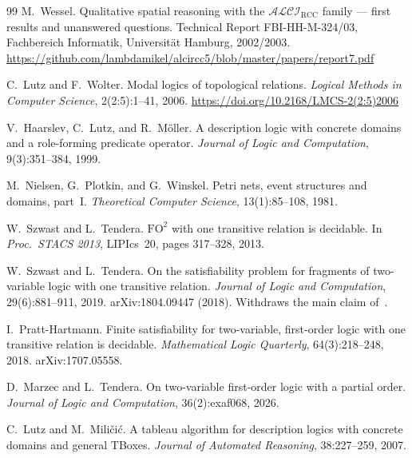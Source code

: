 \documentclass[11pt]{article}
\newcommand{\ALCIRCC}[1]{\mathcal{ALCI}_{\mathrm{RCC#1}}}
\theoremstyle{plain}
\theoremstyle{definition}
\begin{document}
\begin{thebibliography}{99}
M.\ Wessel.
\newblock Qualitative spatial reasoning with the $\ALCIRCC{}$ family ---
  first results and unanswered questions.
\newblock Technical Report FBI-HH-M-324/03, Fachbereich Informatik,
  Universit\"at Hamburg, 2002/2003.
\newblock \url{https://github.com/lambdamikel/alcircc5/blob/master/papers/report7.pdf}

C.\ Lutz and F.\ Wolter.
\newblock Modal logics of topological relations.
\newblock \emph{Logical Methods in Computer Science}, 2(2:5):1--41, 2006.
\newblock \url{https://doi.org/10.2168/LMCS-2(2:5)2006}

V.\ Haarslev, C.\ Lutz, and R.\ M\"oller.
\newblock A description logic with concrete domains and a role-forming
  predicate operator.
\newblock \emph{Journal of Logic and Computation}, 9(3):351--384, 1999.

M.\ Nielsen, G.\ Plotkin, and G.\ Winskel.
\newblock Petri nets, event structures and domains, part~I.
\newblock \emph{Theoretical Computer Science}, 13(1):85--108, 1981.

W.\ Szwast and L.\ Tendera.
\newblock $\mathrm{FO}^2$ with one transitive relation is decidable.
\newblock In \emph{Proc.\ STACS 2013}, LIPIcs~20, pages 317--328, 2013.

W.\ Szwast and L.\ Tendera.
\newblock On the satisfiability problem for fragments of two-variable logic
  with one transitive relation.
\newblock \emph{Journal of Logic and Computation}, 29(6):881--911, 2019.
  arXiv:1804.09447 (2018). Withdraws the main claim
  of~\cite{SzwastTendera2013}.

I.\ Pratt-Hartmann.
\newblock Finite satisfiability for two-variable, first-order logic with one
  transitive relation is decidable.
\newblock \emph{Mathematical Logic Quarterly}, 64(3):218--248, 2018.
  arXiv:1707.05558.

D.\ Marzec and L.\ Tendera.
\newblock On two-variable first-order logic with a partial order.
\newblock \emph{Journal of Logic and Computation}, 36(2):exaf068, 2026.


C.\ Lutz and M.\ Mili\v{c}i\'{c}.
\newblock A tableau algorithm for description logics with concrete domains and
  general TBoxes.
\newblock \emph{Journal of Automated Reasoning}, 38:227--259, 2007.


\end{thebibliography}
\end{document}
